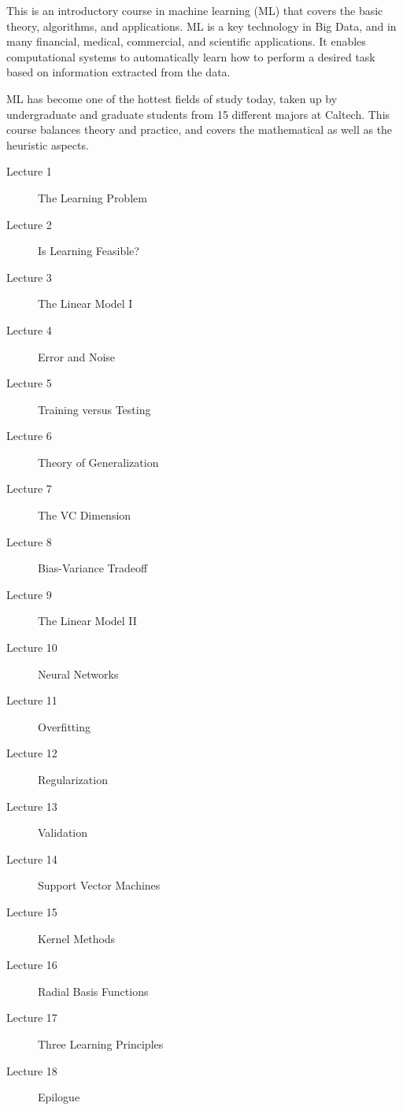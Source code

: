 \documentclass[12pt]{article}
\begin{document}
This is an introductory course in machine learning (ML) that covers the basic theory, 
algorithms, and applications. ML is a key technology in Big Data, and in many financial,
 medical, commercial, and scientific applications. It enables computational systems to 
automatically learn how to perform a desired task based on information extracted from the data. 

ML has become one of the hottest fields of study today, taken up by undergraduate and 
graduate students from 15 different majors at Caltech. This course balances theory and 
practice, and covers the mathematical as well as the heuristic aspects. 

\begin{description}
\item[Lecture 1] The Learning Problem
\item[Lecture 2] Is Learning Feasible?
\item[Lecture 3] The Linear Model I
\item[Lecture 4] Error and Noise
\item[Lecture 5] Training versus Testing
\item[Lecture 6] Theory of Generalization
\item[Lecture 7] The VC Dimension
\item[Lecture 8] Bias-Variance Tradeoff
\item[Lecture 9] The Linear Model II
\item[Lecture 10] Neural Networks
\item[Lecture 11] Overfitting
\item[Lecture 12] Regularization
\item[Lecture 13] Validation
\item[Lecture 14] Support Vector Machines
\item[Lecture 15] Kernel Methods
\item[Lecture 16] Radial Basis Functions
\item[Lecture 17] Three Learning Principles
\item[Lecture 18] Epilogue
\end{description}
\end{document}
